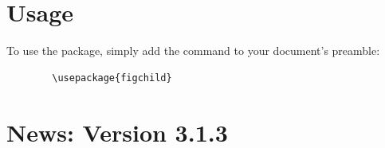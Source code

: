 \documentclass[x11names]{article}
\begin{document}
	
	
	
	
	
	
	\section{Usage}
	
	\hspace{\parindent}To use the package, simply add the command to your document's preamble:
	
	\begin{verbatim}
		\usepackage{figchild}
	\end{verbatim}
	
	
	\section*{News: Version 3.1.3}
	
\end{document}
